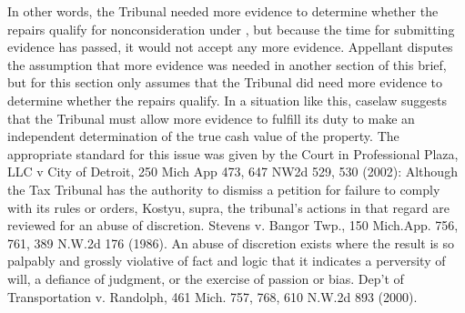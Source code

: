 \documentclass[12pt,\documentclassflag]{michiganCourtOfAppealsBrief}
\begin{document}
In other words, the Tribunal needed more evidence to determine whether the repairs qualify for nonconsideration under , but because the time for submitting evidence has passed, it would not accept any more evidence. Appellant disputes the assumption that more evidence was needed in another section of this brief, but for this section only assumes that the Tribunal did need more evidence to determine whether the repairs qualify. In a situation like this, caselaw suggests that the Tribunal must allow more evidence to fulfill its duty to make an independent determination of the true cash value of the property.
The appropriate standard for this issue was given by the Court in Professional Plaza, LLC v City of Detroit, 250 Mich App 473, 647 NW2d 529, 530 (2002): 
 Although the Tax Tribunal has the authority to dismiss a petition for failure to comply with its rules or orders, Kostyu, supra, the tribunal's actions in that regard are reviewed for an abuse of discretion. Stevens v. Bangor Twp., 150 Mich.App. 756, 761, 389 N.W.2d 176 (1986). An abuse of discretion exists where the result is so palpably and grossly violative of fact and logic that it indicates a perversity of will, a defiance of judgment, or the exercise of passion or bias. Dep't of Transportation v. Randolph, 461 Mich. 757, 768, 610 N.W.2d 893 (2000).
 
\end{document}

